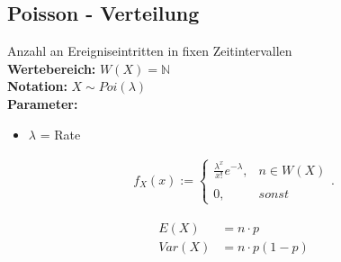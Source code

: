 \documentclass[10pt,a4paper]{article}
\begin{document}
\subsection{Poisson - Verteilung}
Anzahl an Ereigniseintritten in fixen Zeitintervallen \\
\textbf{Wertebereich:} $W(X)= \mathbb{N}$ \\
\textbf{Notation:} $X \sim Poi(\lambda)$ \\
\textbf{Parameter:} \begin{itemize}
    \item $\lambda$ = Rate
\end{itemize}

  \begin{mdframed}[style=exercise]
    \begin{align}
        f_X(x):=\left\{\begin{array}{ll} \frac{\lambda^x}{x!} e^{-\lambda}, & n \in W(X) \\ \\
        0, & sonst \end{array}\right. .
    \end{align}
  \end{mdframed}

  \begin{mdframed}[style=exercise]
    \begin{align}
        E(X) &= n\cdot p \\
        Var(X) &= n\cdot p (1-p) 
    \end{align}
  \end{mdframed}
\end{document}
